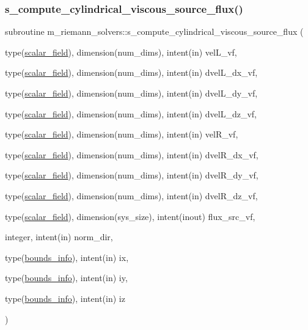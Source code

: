 \subsubsection{\texorpdfstring{s\+\_\+compute\+\_\+cylindrical\+\_\+viscous\+\_\+source\+\_\+flux()}{s\_compute\_cylindrical\_viscous\_source\_flux()}}
{\footnotesize\ttfamily subroutine m\+\_\+riemann\+\_\+solvers\+::s\+\_\+compute\+\_\+cylindrical\+\_\+viscous\+\_\+source\+\_\+flux (\begin{DoxyParamCaption}\item[{type(\hyperlink{structm__derived__types_1_1scalar__field}{scalar\+\_\+field}), dimension(num\+\_\+dims), intent(in)}]{vel\+L\+\_\+vf,  }\item[{type(\hyperlink{structm__derived__types_1_1scalar__field}{scalar\+\_\+field}), dimension(num\+\_\+dims), intent(in)}]{dvel\+L\+\_\+dx\+\_\+vf,  }\item[{type(\hyperlink{structm__derived__types_1_1scalar__field}{scalar\+\_\+field}), dimension(num\+\_\+dims), intent(in)}]{dvel\+L\+\_\+dy\+\_\+vf,  }\item[{type(\hyperlink{structm__derived__types_1_1scalar__field}{scalar\+\_\+field}), dimension(num\+\_\+dims), intent(in)}]{dvel\+L\+\_\+dz\+\_\+vf,  }\item[{type(\hyperlink{structm__derived__types_1_1scalar__field}{scalar\+\_\+field}), dimension(num\+\_\+dims), intent(in)}]{vel\+R\+\_\+vf,  }\item[{type(\hyperlink{structm__derived__types_1_1scalar__field}{scalar\+\_\+field}), dimension(num\+\_\+dims), intent(in)}]{dvel\+R\+\_\+dx\+\_\+vf,  }\item[{type(\hyperlink{structm__derived__types_1_1scalar__field}{scalar\+\_\+field}), dimension(num\+\_\+dims), intent(in)}]{dvel\+R\+\_\+dy\+\_\+vf,  }\item[{type(\hyperlink{structm__derived__types_1_1scalar__field}{scalar\+\_\+field}), dimension(num\+\_\+dims), intent(in)}]{dvel\+R\+\_\+dz\+\_\+vf,  }\item[{type(\hyperlink{structm__derived__types_1_1scalar__field}{scalar\+\_\+field}), dimension(sys\+\_\+size), intent(inout)}]{flux\+\_\+src\+\_\+vf,  }\item[{integer, intent(in)}]{norm\+\_\+dir,  }\item[{type(\hyperlink{structm__derived__types_1_1bounds__info}{bounds\+\_\+info}), intent(in)}]{ix,  }\item[{type(\hyperlink{structm__derived__types_1_1bounds__info}{bounds\+\_\+info}), intent(in)}]{iy,  }\item[{type(\hyperlink{structm__derived__types_1_1bounds__info}{bounds\+\_\+info}), intent(in)}]{iz }\end{DoxyParamCaption})}



